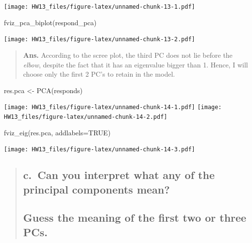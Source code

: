 \documentclass[
]{article}
\newenvironment{Shaded}{\begin{snugshade}}{\end{snugshade}}
\newcommand{\AttributeTok}[1]{\textcolor[rgb]{0.77,0.63,0.00}{#1}}
\newcommand{\ConstantTok}[1]{\textcolor[rgb]{0.00,0.00,0.00}{#1}}
\newcommand{\FunctionTok}[1]{\textcolor[rgb]{0.00,0.00,0.00}{#1}}
\newcommand{\NormalTok}[1]{#1}
\newcommand{\OtherTok}[1]{\textcolor[rgb]{0.56,0.35,0.01}{#1}}
\begin{document}
\texttt{[image: HW13\_files/figure-latex/unnamed-chunk-13-1.pdf]}

\begin{Shaded}
\begin{Highlighting}[]
\FunctionTok{fviz\_pca\_biplot}\NormalTok{(respond\_pca)}
\end{Highlighting}
\end{Shaded}

\texttt{[image: HW13\_files/figure-latex/unnamed-chunk-13-2.pdf]}

\begin{quote}
\textbf{Ans.} According to the scree plot, the third PC does not lie
before the \emph{elbow}, despite the fact that it has an eigenvalue
bigger than 1. Hence, I will choose only the first 2 PC's to retain in
the model.
\end{quote}

\begin{Shaded}
\begin{Highlighting}[]
\NormalTok{res.pca }\OtherTok{\textless{}{-}} \FunctionTok{PCA}\NormalTok{(responds)}
\end{Highlighting}
\end{Shaded}

\texttt{[image: HW13\_files/figure-latex/unnamed-chunk-14-1.pdf]}
\texttt{[image: HW13\_files/figure-latex/unnamed-chunk-14-2.pdf]}

\begin{Shaded}
\begin{Highlighting}[]
\FunctionTok{fviz\_eig}\NormalTok{(res.pca, }\AttributeTok{addlabels=}\ConstantTok{TRUE}\NormalTok{)}
\end{Highlighting}
\end{Shaded}

\texttt{[image: HW13\_files/figure-latex/unnamed-chunk-14-3.pdf]}

\begin{quote}
\hypertarget{c.-can-you-interpret-what-any-of-the-principal-components-mean}{%
\subsection{c.~Can you interpret what any of the principal components
mean?}\label{c.-can-you-interpret-what-any-of-the-principal-components-mean}}

\hypertarget{guess-the-meaning-of-the-first-two-or-three-pcs.}{%
\subsection{Guess the meaning of the first two or three
PCs.}\label{guess-the-meaning-of-the-first-two-or-three-pcs.}}
\end{quote}
\end{document}
